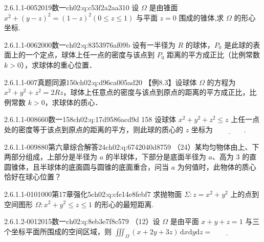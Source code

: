 \begin{q}{2.6.1.1-005}{2019数一}{ch02:q:c53f2a2aa310}
设 $\Omega$ 是由锥面 $x^2+(y-z)^2=(1-z)^2(0\leq z\leq 1)$ 与平面 $z=0$ 围成的锥体,求 $\Omega$ 的形心坐标.
\end{q}

\begin{q}{2.6.1.1-006}{2000数一}{ch02:q:8353976af09b}
设有一半径为 $R$ 的球体，$P_0$ 是此球的表面上的一个定点，球体上任一点的密度与该点到 $P_0$ 距离的平方成正比（比例常数 $k>0$），求球体的重心位置．
\end{q}

\begin{q}{2.6.1.1-007}{真题同源150}{ch02:q:d96ca005ad20}
【例8.3】设球体 $\Omega$ 的方程为 $x^2+y^2+z^2=2Rz$，球体上任意点的密度与该点到原点的距离的平方成正比，比例常数 $k>0$，求球体的质心．
\end{q}

\begin{q}{2.6.1.1-008}{660数一158}{ch02:q:17d9586acd9d}
158 设球体 $x^2+y^2+z^2 \leqslant z$ 上任一点处的密度等于该点到原点的距离的平方，则此球的质心的 $z$ 坐标为 $\underline{\hspace{4em}}$.
\end{q}

\begin{q}{2.6.1.1-009}{880第六章综合解答24}{ch02:q:6742040d8759}
（24）某均匀物体由上、下两部分组成，上部分是半径为 $a$ 的半球体，下部分是底面半径为 $a$、高为 $3$ 的直圆锥体，且半球体的底面圆与圆锥的底面重合，问当 $a$ 为何值时，此物体的质心恰好在球心位置？
\end{q}

\begin{q}{2.6.1.1-010}{1000第17章强化5}{ch02:q:cfe14e8febf7}
求抛物面 $\Sigma:z=x^2+y^2$ 上的点到空间图形 $\Omega:x^2+y^2\leq z\leq 1$ 的形心的最短距离.
\end{q}

\par\addvspace{2.4ex}\noindent
\begin{minipage}{\linewidth}

\begin{q}{2.6.1.2-001}{2015数一}{ch02:q:8eb3e7f8c579}
（12）设 $\Omega$ 是由平面 $x+y+z=1$ 与三个坐标平面所围成的空间区域，则
$\displaystyle \iiint_{\Omega}(x+2y+3z)\,\mathrm{d}x\mathrm{d}y\mathrm{d}z=\underline{\hspace{4em}}$
\end{q}
\end{minipage}


